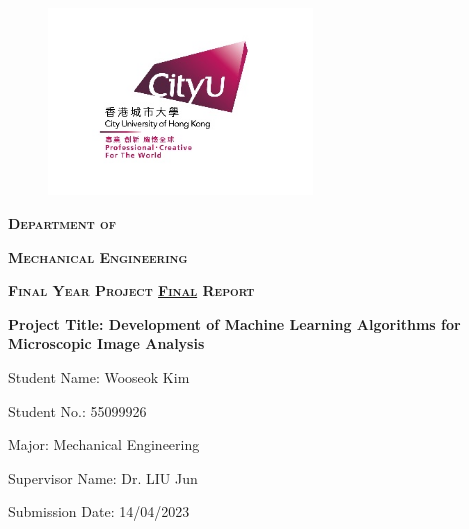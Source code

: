 \begin{titlepage}
\begin{figure}[t!]
    \includegraphics[width=7cm, right]{Images/CityU Logo.jpeg}
\end{figure}
{\LARGE \textbf{\textsc{Department of}}}

{\LARGE \textbf{\textsc{Mechanical Engineering}}}

\vspace{1cm}

{\Large \textbf{\textsc{Final Year Project \underline{Final} Report}}}

\vspace{1.5cm}

{\large \textbf{Project Title: Development of Machine Learning Algorithms for Microscopic Image Analysis}}

\vspace{\fill}

Student Name: Wooseok Kim 

Student No.: 55099926

Major: Mechanical Engineering

Supervisor Name: Dr. LIU Jun

Submission Date: 14/04/2023

\end{titlepage}